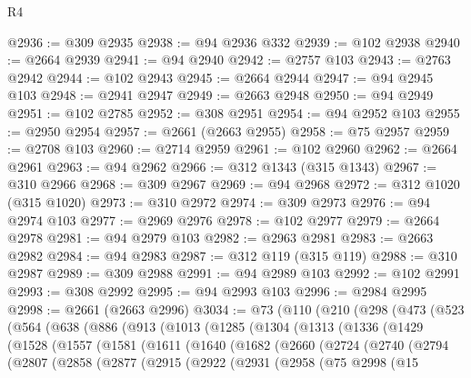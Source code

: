 \begin{lexlean}{R4}
\begin{coremodule}
@2936 := @309 @2935
@2938 := @94 @2936 @332
@2939 := @102 @2938
@2940 := @2664 @2939
@2941 := @94 @2940
@2942 := @2757 @103
@2943 := @2763 @2942
@2944 := @102 @2943
@2945 := @2664 @2944
@2947 := @94 @2945 @103
@2948 := @2941 @2947
@2949 := @2663 @2948
@2950 := @94 @2949
@2951 := @102 @2785
@2952 := @308 @2951
@2954 := @94 @2952 @103
@2955 := @2950 @2954
@2957 := @2661 (@2663 @2955)
@2958 := @75 @2957
@2959 := @2708 @103
@2960 := @2714 @2959
@2961 := @102 @2960
@2962 := @2664 @2961
@2963 := @94 @2962
@2966 := @312 @1343 (@315 @1343)
@2967 := @310 @2966
@2968 := @309 @2967
@2969 := @94 @2968
@2972 := @312 @1020 (@315 @1020)
@2973 := @310 @2972
@2974 := @309 @2973
@2976 := @94 @2974 @103
@2977 := @2969 @2976
@2978 := @102 @2977
@2979 := @2664 @2978
@2981 := @94 @2979 @103
@2982 := @2963 @2981
@2983 := @2663 @2982
@2984 := @94 @2983
@2987 := @312 @119 (@315 @119)
@2988 := @310 @2987
@2989 := @309 @2988
@2991 := @94 @2989 @103
@2992 := @102 @2991
@2993 := @308 @2992
@2995 := @94 @2993 @103
@2996 := @2984 @2995
@2998 := @2661 (@2663 @2996)
@3034 := @73
    (@110
      (@210
        (@298
          (@473
            (@523
              (@564
                (@638
                  (@886
                    (@913
                      (@1013
                        (@1285
                          (@1304
                            (@1313
                              (@1336
                                (@1429
                                  (@1528
                                    (@1557
                                      (@1581
                                        (@1611
                                          (@1640
                                            (@1682
                                              (@2660
                                                (@2724
                                                  (@2740
                                                    (@2794
                                                      (@2807
                                                        (@2858
                                                          (@2877
                                                            (@2915
                                                              (@2922
                                                                (@2931
                                                                  (@2958
                                                                    (@75
                                                                      @2998
                                                                      (@15

\end{coremodule}
\end{lexlean}
